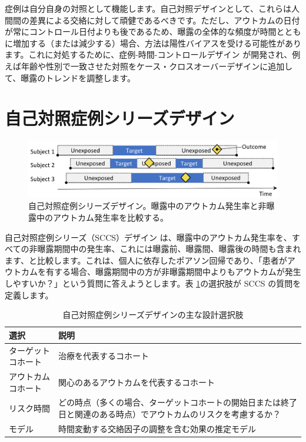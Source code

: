 \documentclass[
  11pt]{book}
\theoremstyle{definition}
\theoremstyle{definition}
\theoremstyle{definition}
\theoremstyle{definition}
\theoremstyle{remark}
\begin{document}
症例は自分自身の対照として機能します。自己対照デザインとして、これらは人間間の差異による交絡に対して頑健であるべきです。ただし、アウトカムの日付が常にコントロール日付よりも後であるため、曝露の全体的な頻度が時間とともに増加する（または減少する）場合、方法は陽性バイアスを受ける可能性があります。これに対処するために、症例-時間-コントロールデザイン \citep{suissa_1995} が開発され、例えば年齢や性別で一致させた対照をケース・クロスオーバーデザインに追加して、曝露のトレンドを調整します。

\section{自己対照症例シリーズデザイン}\label{ux81eaux5df1ux5bfeux7167ux75c7ux4f8bux30b7ux30eaux30fcux30baux30c7ux30b6ux30a4ux30f3}


\begin{figure}[h]

{\centering \includegraphics[width=0.9\linewidth]{images/PopulationLevelEstimation/selfControlledCaseSeries} 

}

\caption{自己対照症例シリーズデザイン。曝露中のアウトカム発生率と非曝露中のアウトカム発生率を比較する。}\label{fig:selfControlledCaseSeries}
\end{figure}

自己対照症例シリーズ（SCCS）デザイン \citep{farrington_1995, whitaker_2006} は、曝露中のアウトカム発生率を、すべての非曝露期間中の発生率、これには曝露前、曝露間、曝露後の時間も含まれます、と比較します。これは、個人に依存したポアソン回帰であり、「患者がアウトカムを有する場合、曝露期間中の方が非曝露期間中よりもアウトカムが発生しやすいか？」という質問に答えようとします。表 \ref{tab:sccsChoices}の選択肢が SCCS の質問を定義します。  

\begin{table}
\centering
\caption{\label{tab:sccsChoices}自己対照症例シリーズデザインの主な設計選択肢}
\centering
\begin{tabular}[t]{l>{\raggedright\arraybackslash}p{9cm}}
\toprule
選択 & 説明\\
\midrule
ターゲットコホート & 治療を代表するコホート\\
アウトカムコホート & 関心のあるアウトカムを代表するコホート\\
リスク時間 & どの時点（多くの場合、ターゲットコホートの開始日または終了日と関連のある時点）でアウトカムのリスクを考慮するか？\\
モデル & 時間変動する交絡因子の調整を含む効果の推定モデル\\
\bottomrule
\end{tabular}
\end{table}
\end{document}
